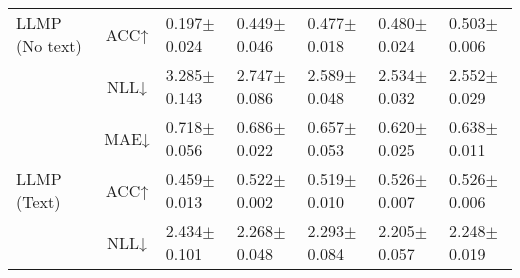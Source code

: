 \begin{table*}[htbp]
\begin{small}
\begin{sc}
\begin{adjustbox}{max width=\textwidth}
\begin{tabular}{rclllll}
    \multicolumn{1}{l}{LLMP (No text)} & ACC↑  & 0.197$\pm$0.024 & 0.449$\pm$0.046 & 0.477$\pm$0.018 & 0.480$\pm$0.024 & 0.503$\pm$0.006 \\
          & NLL↓  & 3.285$\pm$0.143 & 2.747$\pm$0.086 & 2.589$\pm$0.048 & 2.534$\pm$0.032 & 2.552$\pm$0.029 \\
    \midrule
          & MAE↓  & 0.718$\pm$0.056 & 0.686$\pm$0.022 & 0.657$\pm$0.053 & 0.620$\pm$0.025 & 0.638$\pm$0.011 \\
    \multicolumn{1}{l}{LLMP (Text)} & ACC↑  & 0.459$\pm$0.013 & 0.522$\pm$0.002 & 0.519$\pm$0.010 & 0.526$\pm$0.007 & 0.526$\pm$0.006 \\
          & NLL↓  & 2.434$\pm$0.101 & 2.268$\pm$0.048 & 2.293$\pm$0.084 & 2.205$\pm$0.057 & 2.248$\pm$0.019 \\
    \bottomrule
    \end{tabular}%
    \end{adjustbox}
  \end{sc}
  \end{small}
  \vskip -0.1in
\end{table*}%

